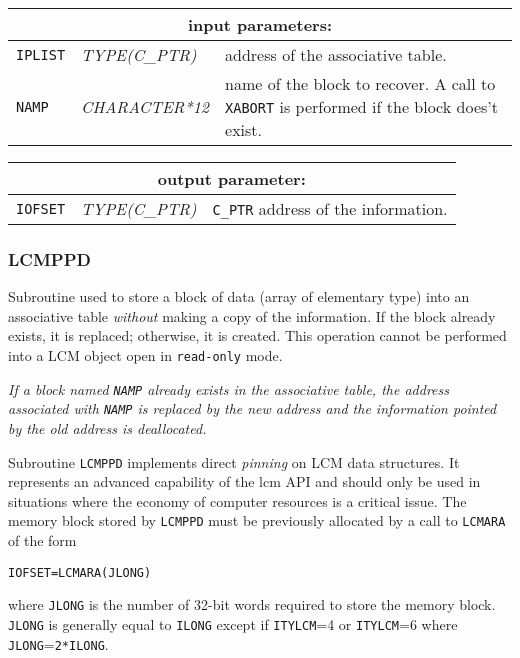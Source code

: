 \vskip 0.5cm

\noindent
\begin{tabular}{|p{1.5cm}|p{3cm}|p{10cm}|}
\hline
\multicolumn{3}{|c|}{\bf input parameters:} \\
\hline
{\tt IPLIST} & {\it TYPE(C\_PTR)} & address of the associative table. \\
\hline
{\tt NAMP} & {\it CHARACTER*12} & name of the block to recover.
A call to {\tt XABORT} is performed if the block does't exist. \\
\hline
\end{tabular}

\vskip 0.8cm

\noindent
\begin{tabular}{|p{1.5cm}|p{3cm}|p{10cm}|}
\hline
\multicolumn{3}{|c|}{\bf output parameter:} \\
\hline
{\tt IOFSET} &  {\it TYPE(C\_PTR)} & {\tt C\_PTR} address of the information. \\
\hline
\end{tabular}

\subsubsection{LCMPPD}

Subroutine used to store a block of data (array of elementary type) into an associative table
{\sl without} making a copy of the information. If the block already exists, it is replaced;
otherwise, it is created. This operation cannot be performed into a LCM object open in {\tt read-only} mode.

\vskip 0.2cm

{\sl If a block named  {\tt NAMP} already exists in the associative table, the address associated
with {\tt NAMP} is replaced by the new address and the information pointed by the old address
is deallocated.}

\vskip 0.2cm

Subroutine {\tt LCMPPD} implements direct {\sl pinning} on LCM data structures. It represents an advanced capability of the {\sc lcm} API and should only be used in situations where
the economy of computer resources is a critical issue. The memory block stored by {\tt LCMPPD} must be previously
allocated by a call to {\tt LCMARA} of the form
\begin{verbatim}
IOFSET=LCMARA(JLONG)
\end{verbatim}

\noindent where {\tt JLONG} is the number of 32-bit words required to store the memory block. {\tt JLONG} is generally equal to {\tt ILONG} except if
{\tt ITYLCM}=4 or {\tt ITYLCM}=6 where {\tt JLONG}={\tt 2*ILONG}.

